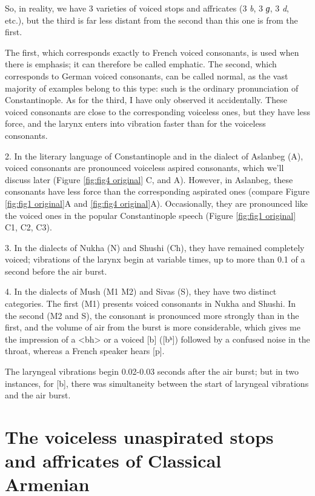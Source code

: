 So, in reality, we have 3 varieties of voiced stops and affricates (3 \textit{b}, 3 \textit{ɡ}, 3 \textit{d}, etc.), but the third is far less distant from the second than this one is from the first.

The first, which corresponds exactly to French voiced consonants, is used when there is emphasis; it can therefore be called emphatic. The second, which corresponds to German voiced consonants, can be called normal, as the vast majority of examples belong to this type: such is the ordinary pronunciation of Constantinople. As for the third, I have only observed it accidentally. These voiced consonants are close to the corresponding voiceless ones, but they have less force, and the larynx enters into vibration faster than for the voiceless consonants.

2. In the literary language of Constantinople and in the dialect of Aslanbeg (A), voiced consonants are pronounced voiceless aspired consonants, which we'll discuss later (Figure \ref{fig:fig4 original} C, and A). However, in Aslanbeg, these consonants have less force than the corresponding aspirated ones (compare Figure \ref{fig:fig1 original}A and \ref{fig:fig4 original}A). Occasionally, they are pronounced like the voiced ones in the popular Constantinople speech (Figure \ref{fig:fig1 original} C1, C2, C3).

3. In the dialects of Nukha (N) and Shushi (Ch), they have remained completely voiced; vibrations of the larynx begin at variable times, up to more than 0.1 of a second before the air burst.

4. In the dialects of Mush (M1 M2) and Sivas (S), they have two distinct categories. The first (M1) presents voiced consonants in Nukha and Shushi. In the second (M2 and S), the consonant is pronounced more strongly than in the first, and the volume of air from the burst is more considerable,  which gives me the impression of a <bh> or a voiced [b] ([bʰ]) followed by a confused noise in the throat, whereas a French speaker hears [p].

The laryngeal vibrations begin 0.02-0.03 seconds after the air burst; but in two instances, for [b], there was simultaneity between the start of laryngeal vibrations and the air burst.

\section{The voiceless unaspirated stops and affricates of Classical Armenian}

